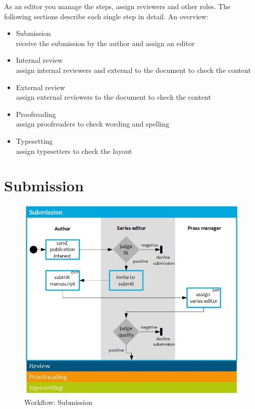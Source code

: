 As an editor you manage the steps, assign reviewers and other roles. The following sections describe each single step in detail. An overview:

\begin{itemize}
\item Submission \\receive the submission by the author and assign an editor
\item Internal review \\assign internal reviewers and external to the document to check the content 
\item External review \\assign external reviewers to the document to check the content
\item Proofreading \\assign proofreaders to check wording and spelling
\item Typesetting \\assign typesetters to check the layout
\end{itemize}



\section{Submission}

\begin{figure}[h] \centering
\includegraphics[width=1\textwidth]{./img/workflow_submission.jpg} \caption{Workflow: Submission}
\label{fig:workflowSubmission}
\end{figure}

